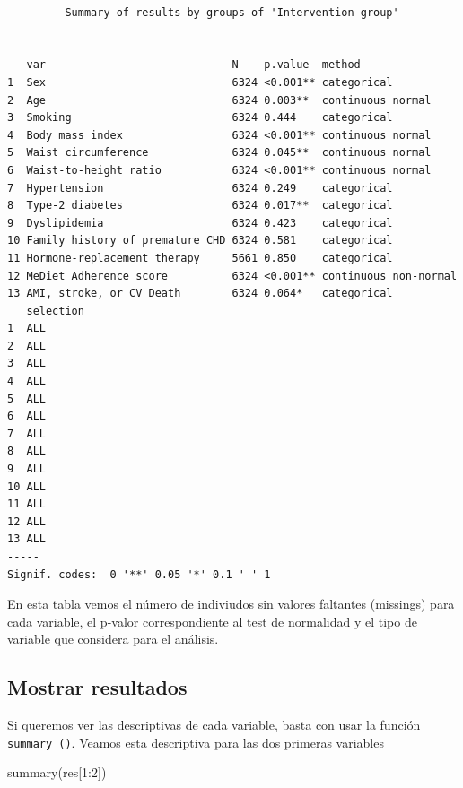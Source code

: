 \documentclass[
]{book}
\newenvironment{Shaded}{\begin{snugshade}}{\end{snugshade}}
\newcommand{\DecValTok}[1]{\textcolor[rgb]{0.00,0.00,0.81}{#1}}
\newcommand{\FunctionTok}[1]{\textcolor[rgb]{0.00,0.00,0.00}{#1}}
\newcommand{\NormalTok}[1]{#1}
\newcommand{\SpecialCharTok}[1]{\textcolor[rgb]{0.00,0.00,0.00}{#1}}
\begin{document}
\begin{verbatim}

-------- Summary of results by groups of 'Intervention group'---------


   var                             N    p.value  method               
1  Sex                             6324 <0.001** categorical          
2  Age                             6324 0.003**  continuous normal    
3  Smoking                         6324 0.444    categorical          
4  Body mass index                 6324 <0.001** continuous normal    
5  Waist circumference             6324 0.045**  continuous normal    
6  Waist-to-height ratio           6324 <0.001** continuous normal    
7  Hypertension                    6324 0.249    categorical          
8  Type-2 diabetes                 6324 0.017**  categorical          
9  Dyslipidemia                    6324 0.423    categorical          
10 Family history of premature CHD 6324 0.581    categorical          
11 Hormone-replacement therapy     5661 0.850    categorical          
12 MeDiet Adherence score          6324 <0.001** continuous non-normal
13 AMI, stroke, or CV Death        6324 0.064*   categorical          
   selection
1  ALL      
2  ALL      
3  ALL      
4  ALL      
5  ALL      
6  ALL      
7  ALL      
8  ALL      
9  ALL      
10 ALL      
11 ALL      
12 ALL      
13 ALL      
-----
Signif. codes:  0 '**' 0.05 '*' 0.1 ' ' 1 
\end{verbatim}

En esta tabla vemos el número de indiviudos sin valores faltantes (missings) para cada variable, el p-valor correspondiente al test de normalidad y el tipo de variable que considera para el análisis.

\hypertarget{mostrar-resultados}{%
\subsection*{Mostrar resultados}\label{mostrar-resultados}}

Si queremos ver las descriptivas de cada variable, basta con usar la función \texttt{summary\ ()}. Veamos esta descriptiva para las dos primeras variables

\begin{Shaded}
\begin{Highlighting}[]
\FunctionTok{summary}\NormalTok{(res[}\DecValTok{1}\SpecialCharTok{:}\DecValTok{2}\NormalTok{])}
\end{Highlighting}
\end{Shaded}
\end{document}
